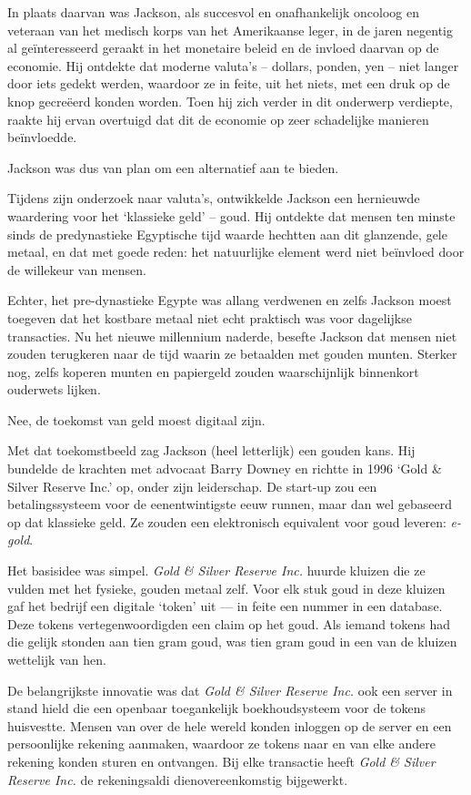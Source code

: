 \documentclass[
  a5paper,
  smalldemyvopaper,11pt,twoside,onecolumn,openright,extrafontsizes]{memoir}
\begin{document}
In plaats daarvan was Jackson, als succesvol en onafhankelijk oncoloog
en veteraan van het medisch korps van het Amerikaanse leger, in de jaren
negentig al geïnteresseerd geraakt in het monetaire beleid en de invloed
daarvan op de economie. Hij ontdekte dat moderne valuta's -- dollars,
ponden, yen -- niet langer door iets gedekt werden, waardoor ze in
feite, uit het niets, met een druk op de knop gecreëerd konden worden.
Toen hij zich verder in dit onderwerp verdiepte, raakte hij ervan
overtuigd dat dit de economie op zeer schadelijke manieren beïnvloedde.

Jackson was dus van plan om een alternatief aan te bieden.

Tijdens zijn onderzoek naar valuta's, ontwikkelde Jackson een hernieuwde
waardering voor het `klassieke geld' -- goud. Hij ontdekte dat mensen
ten minste sinds de predynastieke Egyptische tijd waarde hechtten aan
dit glanzende, gele metaal, en dat met goede reden: het natuurlijke
element werd niet beïnvloed door de willekeur van mensen.

Echter, het pre-dynastieke Egypte was allang verdwenen en zelfs Jackson
moest toegeven dat het kostbare metaal niet echt praktisch was voor
dagelijkse transacties. Nu het nieuwe millennium naderde, besefte
Jackson dat mensen niet zouden terugkeren naar de tijd waarin ze
betaalden met gouden munten. Sterker nog, zelfs koperen munten en
papiergeld zouden waarschijnlijk binnenkort ouderwets lijken.

Nee, de toekomst van geld moest digitaal zijn.

Met dat toekomstbeeld zag Jackson (heel letterlijk) een gouden kans. Hij
bundelde de krachten met advocaat Barry Downey en richtte in 1996 `Gold
\& Silver Reserve Inc.' op, onder zijn leiderschap. De start-up zou een
betalingssysteem voor de eenentwintigste eeuw runnen, maar dan wel
gebaseerd op dat klassieke geld. Ze zouden een elektronisch equivalent
voor goud leveren: \emph{e-gold}.

Het basisidee was simpel. \emph{Gold \& Silver Reserve Inc.} huurde
kluizen die ze vulden met het fysieke, gouden metaal zelf. Voor elk stuk
goud in deze kluizen gaf het bedrijf een digitale `token' uit --- in
feite een nummer in een database. Deze tokens vertegenwoordigden een
claim op het goud. Als iemand tokens had die gelijk stonden aan tien
gram goud, was tien gram goud in een van de kluizen wettelijk van hen.

De belangrijkste innovatie was dat \emph{Gold \& Silver Reserve Inc.}
ook een server in stand hield die een openbaar toegankelijk
boekhoudsysteem voor de tokens huisvestte. Mensen van over de hele
wereld konden inloggen op de server en een persoonlijke rekening
aanmaken, waardoor ze tokens naar en van elke andere rekening konden
sturen en ontvangen. Bij elke transactie heeft \emph{Gold \& Silver
Reserve Inc.} de rekeningsaldi dienovereenkomstig bijgewerkt.
\end{document}
